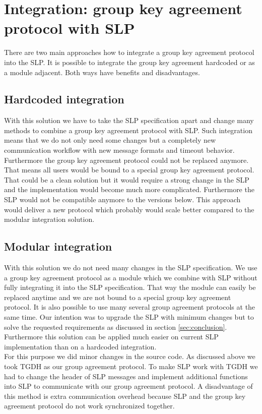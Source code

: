 \section{Integration: group key agreement protocol with SLP}
There are two main approaches how to integrate a group key agreement protocol into the SLP. It is possible to integrate the group key agreement hardcoded or as a module adjacent. Both ways have benefits and disadvantages. 

\subsection{Hardcoded integration}
With this solution we have to take the SLP specification apart and change many methods to combine a group key agreement protocol with SLP. Such integration means that we do not only need some changes but a completely new communication workflow with new message formats and timeout behavior. Furthermore the group key agreement protocol could not be replaced anymore. That means all users would be bound to a special group key agreement protocol. That could be a clean solution but it would require a strong change in the SLP and the implementation would become much more complicated. Furthermore the SLP would not be compatible anymore to the versions below. This approach would deliver a new protocol which probably would scale better compared to the modular integration solution.

\subsection{Modular integration}
With this solution we do not need many changes in the SLP specification. We use a group key agreement protocol as a module which we combine with SLP without fully integrating it into the SLP specification. That way the module can easily be replaced anytime and we are not bound to a special group key agreement protocol. It is also possible to use many several group agreement protocols at the same time. Our intention was to upgrade the SLP with minimum changes but to solve the requested requirements as discussed in section \ref{sec:conclusion}. Furthermore this solution can be applied much easier on current SLP implementation than on a hardcoded integration.\\
For this purpose we did minor changes in the source code. As discussed above we took TGDH as our group agreement protocol. To make SLP work with TGDH we had to change the header of SLP messages and implement additional functions into SLP to communicate with our group agreement protocol. A disadvantage of this method is extra communication overhead because SLP and the group key agreement protocol do not work synchronized together.

